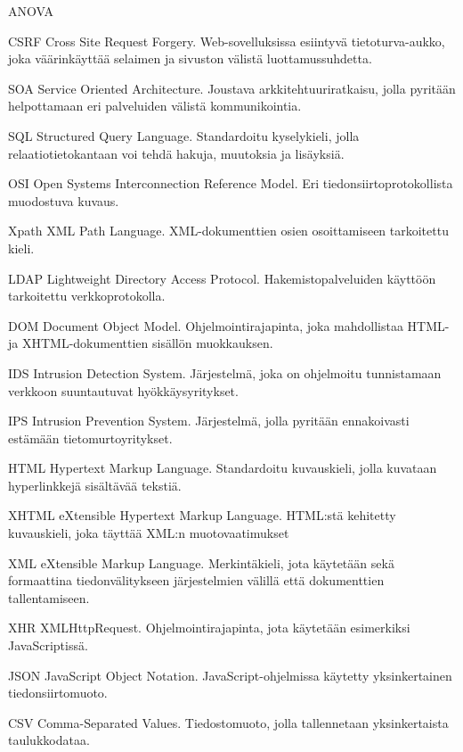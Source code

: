 \begin{abbrlist}{ANOVA}
\item[CSRF]	Cross Site Request Forgery. Web-sovelluksissa esiintyvä tietoturva-aukko, joka väärinkäyttää selaimen ja sivuston välistä luottamussuhdetta.
\item[SOA]	Service Oriented Architecture. Joustava arkkitehtuuriratkaisu, jolla pyritään helpottamaan eri palveluiden välistä kommunikointia.
\item[SQL]	Structured Query Language. Standardoitu kyselykieli, jolla relaatiotietokantaan voi tehdä hakuja, muutoksia ja lisäyksiä.
\item[OSI]	Open Systems Interconnection Reference Model. Eri tiedonsiirtoprotokollista muodostuva kuvaus.
\item[Xpath]    XML Path Language. XML-dokumenttien osien osoittamiseen tarkoitettu kieli.	
\item[LDAP]	Lightweight Directory Access Protocol. Hakemistopalveluiden käyttöön tarkoitettu verkkoprotokolla.
\item[DOM]	Document Object Model. Ohjelmointirajapinta, joka mahdollistaa HTML- ja XHTML-dokumenttien sisällön muokkauksen.
\item[IDS]	Intrusion Detection System. Järjestelmä, joka on ohjelmoitu tunnistamaan verkkoon suuntautuvat hyökkäysyritykset.
\item[IPS]	Intrusion Prevention System. Järjestelmä, jolla pyritään ennakoivasti estämään tietomurtoyritykset.
\item[HTML]	Hypertext Markup Language. Standardoitu kuvauskieli, jolla kuvataan hyperlinkkejä sisältävää tekstiä.
\item[XHTML]    eXtensible Hypertext Markup Language. HTML:stä kehitetty kuvauskieli, joka täyttää XML:n muotovaatimukset
\item[XML]	eXtensible Markup Language. Merkintäkieli, jota käytetään sekä formaattina tiedonvälitykseen järjestelmien välillä että dokumenttien tallentamiseen.
\item[XHR]	XMLHttpRequest. Ohjelmointirajapinta, jota käytetään esimerkiksi JavaScriptissä.
\item[JSON]	JavaScript Object Notation. JavaScript-ohjelmissa käytetty yksinkertainen tiedonsiirtomuoto.
\item[CSV]	Comma-Separated Values. Tiedostomuoto, jolla tallennetaan yksinkertaista taulukkodataa.
\end{abbrlist}
